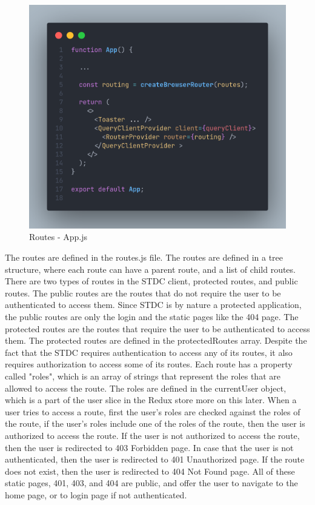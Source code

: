 \begin{justify}
        \begin{figure}[H]
            \centerline{\includegraphics[width=150mm,scale=1]{figures/implementation_and_testing/implementation/frontend/approutes.png}}
            \caption{Routes - App.js}
        \end{figure}

        \vspace{0.25cm}
        \newendline The routes are defined in the routes.js file. The routes are defined in a tree structure, where each route can have a parent route, and a list of child routes. There are two types of routes in the STDC client, protected routes, and public routes. The public routes are the routes that do not require the user to be authenticated to access them. Since STDC is by nature a protected application, the public routes are only the login and the static pages like the 404 page. The protected routes are the routes that require the user to be authenticated to access them. The protected routes are defined in the protectedRoutes array. Despite the fact that the STDC requires authentication to access any of its routes, it also requires authorization to access some of its routes. Each route has a property called "roles", which is an array of strings that represent the roles that are allowed to access the route. The roles are defined in the currentUser object, which is a part of the user slice in the Redux store more on this later. When a user tries to access a route, first the user's roles are checked against the roles of the route, if the user's roles include one of the roles of the route, then the user is authorized to access the route. If the user is not authorized to access the route, then the user is redirected to 403 Forbidden page. In case that the user is not authenticated, then the user is redirected to 401 Unauthorized page. If the route does not exist, then the user is redirected to 404 Not Found page. All of these static pages, 401, 403, and 404 are public, and offer the user to navigate to the home page, or to login page if not authenticated.


\end{justify}
